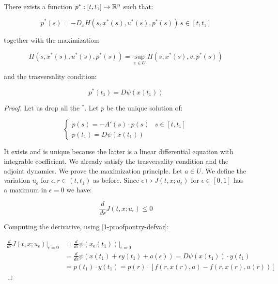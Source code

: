 \begin{theorem}\label{1-proofpontry-theo}
    There exists a function $p^{\ast}:[t,t_1]\rightarrow \mathbb{R}^n$ such that:

    \begin{equation}
        \dot{p}^{\ast}(s) = -D_x H(s,x^{\ast}(s),u^{\ast}(s),p^{\ast}(s))\, s\in[t,t_1]
    \end{equation}

    together with the maximization:

    \begin{equation}
        H(s,x^{\ast}(s),u^{\ast}(s),p^{\ast}(s)) = \sup_{v\in U} H(s,x^{\ast}(s),v,p^{\ast}(s))
    \end{equation}

    and the trasversality condition:

    \begin{equation}
        p^{\ast}(t_1) = D\psi(x(t_1))
    \end{equation}

    \begin{proof}
        Let us drop all the $^{\ast}$. Let $p$ be the unique solution of:

        \begin{equation}
            \begin{cases}
                \dot{p}(s) = - A'(s)\cdot p(s) & s\in[t,t_1] \\
                p(t_1) = D\psi(x(t_1))
            \end{cases}
        \end{equation}

        It exists and is unique because the latter is a linear differential equation with integrable coefficient. 
        We already satisfy the trasversality condition and the adjoint dynamics. We prove the 
        maximization principle. Let $a\in U$. We define the variation $u_{\epsilon}$ for $\epsilon,r\in(t,t_1)$ as before.
        Since $\epsilon\mapsto  J(t,x;u_{\epsilon})$ for $\epsilon\in[0,1]$ has a maximum in $\epsilon=0$ we have:
        
        \begin{equation}\label{1-proofpontry-dervar0}
            \frac{d}{d\epsilon}J(t,x;u_{\epsilon})\leq0
        \end{equation}

        Computing the derivative, using \ref{1-proofpontry-defvar}:

        \begin{align}
            \frac{d}{d\epsilon}J(t,x;u_{\epsilon})\big|_{\epsilon=0} & = \frac{d}{d\epsilon}\psi(x_{\epsilon}(t_1))\big|_{\epsilon=0} \\
            & = \frac{d}{d\epsilon}\psi(x(t_1) + \epsilon y(t_1) + o(\epsilon)) = D\psi(x(t_1))\cdot y(t_1) \\
            & = p(t_1)\cdot y(t_1) = p(r)\cdot[f(r,x(r),a)-f(r,x(r),u(r))]
        \end{align}


\end{proof}
\end{theorem}

